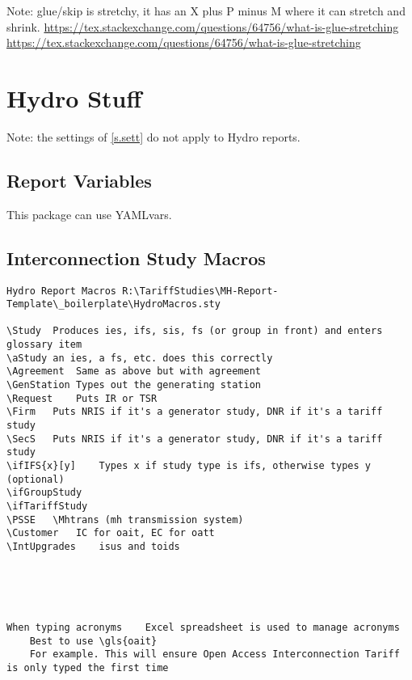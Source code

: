 \documentclass{\FormatDir corpboreportMulti}
\begin{document}
Note: glue/skip is stretchy, it has an X plus P minus M where it can stretch and shrink.
\url{https://tex.stackexchange.com/questions/64756/what-is-glue-stretching}
\url{https://tex.stackexchange.com/questions/64756/what-is-glue-stretching}

\section{Hydro Stuff}

Note: the settings of \cref{s.sett} do not apply to Hydro reports.

\subsection{Report Variables}
This package can use YAMLvars.

\subsection{Interconnection Study Macros}

\begin{lstlisting}
Hydro Report Macros	R:\TariffStudies\MH-Report-Template\_boilerplate\HydroMacros.sty

\Study	Produces ies, ifs, sis, fs (or group in front) and enters glossary item
\aStudy	an ies, a fs, etc. does this correctly
\Agreement	Same as above but with agreement
\GenStation	Types out the generating station
\Request	Puts IR or TSR
\Firm	Puts NRIS if it's a generator study, DNR if it's a tariff study
\SecS	Puts NRIS if it's a generator study, DNR if it's a tariff study
\ifIFS{x}[y]	Types x if study type is ifs, otherwise types y (optional)
\ifGroupStudy
\ifTariffStudy
\PSSE	\Mhtrans (mh transmission system)
\Customer	IC for oait, EC for oatt
\IntUpgrades	isus and toids





When typing acronyms	Excel spreadsheet is used to manage acronyms
	Best to use \gls{oait}
	For example. This will ensure Open Access Interconnection Tariff is only typed the first time

\end{lstlisting}

\PrintEndOfDocument
\end{document}

